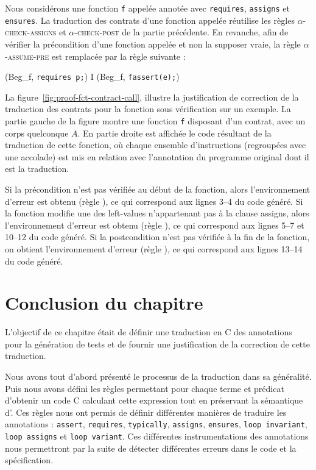 

Nous considérons une fonction \lstinline'f' appelée annotée avec
\lstinline'requires', \lstinline'assigns' et \lstinline'ensures'.
La traduction des contrats d'une fonction appelée réutilise les règles
\textsc{$\alpha$-check-assigns} et \textsc{$\alpha$-check-post} de la partie
précédente.
En revanche, afin de vérifier la précondition d'une fonction appelée et non la
supposer vraie, la règle \textsc{$\alpha$-assume-pre} est remplacée par la règle
suivante :

{\scriptsize
  {
    {(Beg_f, \mbox{\lstinline'requires p;'})
      I \concat (Beg_f, \mbox{\lstinline'fassert(e);'})}
  }
}

La figure~\ref{fig:proof-fct-contract-call}, illustre la justification de
correction
de la traduction des contrats pour la fonction sous vérification sur un exemple.
La partie gauche de la figure montre une fonction \lstinline'f' disposant d'un
contrat, avec un corps quelconque $A$.
En partie droite est affichée le code résultant de la traduction de cette
fonction, où chaque ensemble d'instructions (regroupées avec une accolade) est
mis en relation avec l'annotation du programme original dont il est la
traduction.

Si la précondition n'est pas vérifiée au début de la fonction, alors
l'environnement d'erreur est obtenu (règle ), ce qui correspond aux
lignes 3--4 du code généré.
Si la fonction modifie une des left-values n'appartenant pas à la clause
assigns, alors l'environnement d'erreur est obtenu (règle ), ce qui
correspond aux lignes 5--7 et 10--12 du code généré.
Si la postcondition n'est pas vérifiée à la fin de la fonction, on obtient
l'environnement d'erreur (règle ), ce qui correspond aux lignes
13--14 du code généré.


\section*{Conclusion du chapitre}

L'objectif de ce chapitre était de définir une traduction en C des annotations
\eacsl pour la génération de tests et de fournir une justification de la
correction de cette traduction.

Nous avons tout d'abord présenté le processus de la traduction dans sa
généralité.
Puis nous avons défini les règles permettant pour chaque terme et prédicat
\eacsl d'obtenir un code C calculant cette expression tout en préservant la
sémantique d'\eacsl.
Ces règles nous ont permis de définir différentes manières de traduire les
annotations \eacsl : \lstinline'assert', \lstinline'requires',
\lstinline'typically', \lstinline'assigns', \lstinline'ensures',
\lstinline'loop invariant', \lstinline'loop assigns' et
\lstinline'loop variant'.
Ces différentes instrumentations des annotations nous permettront par la suite
de détecter différentes erreurs dans le code et la spécification.

